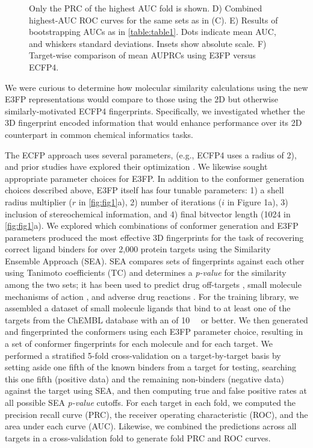 \documentclass[../main.tex]{subfiles}
\begin{document}
\begin{refsection}
\begin{figure}
{        Only the PRC of the highest AUC fold is shown.
        D) Combined highest-AUC ROC curves for the same sets as in  (C).
        E) Results of bootstrapping AUCs as in \cref{table:table1}.
        Dots indicate mean AUC, and whiskers standard deviations.
        Insets show absolute scale.
        F) Target-wise comparison of mean AUPRCs using E3FP versus ECFP4.}
    \label{fig:fig2}
\end{figure}

We were curious to determine how molecular similarity calculations using the new E3FP representations would compare to those using the 2D but otherwise similarly-motivated ECFP4 fingerprints.
Specifically, we investigated whether the 3D fingerprint encoded information that would enhance performance over its 2D counterpart in common chemical informatics tasks.

The ECFP approach uses several parameters, (e.g., ECFP4 uses a radius of 2), and prior studies have explored their optimization  \cite{hert_2004}.
We likewise sought appropriate parameter choices for E3FP.
In addition to the conformer generation choices described above, E3FP itself has four tunable parameters: 1) a shell radius multiplier ($r$ in \cref{fig:fig1}a), 2) number of iterations ($i$ in Figure 1a), 3) inclusion of stereochemical information, and 4) final bitvector length (1024 in \cref{fig:fig1}a).
We explored which combinations of conformer generation and E3FP parameters produced the most effective 3D fingerprints for the task of recovering correct ligand binders for over 2,000 protein targets using the Similarity Ensemble Approach (SEA).
SEA compares sets of fingerprints against each other using Tanimoto coefficients (TC) and determines a \emph{p-value} for the similarity among the two sets; it has been used to predict drug off-targets \cite{keiser_2007,keiser_2009,degraw_2010,yee_2015}, small molecule mechanisms of action \cite{laggner_2011,lemieux_2013,bruni_2016}, and adverse drug reactions  \cite{keiser_2007,lounkine_2012,lorberbaum_2015}.
For the training library, we assembled a dataset of small molecule ligands that bind to at least one of the targets from the ChEMBL database with an \ICfifty{} of  \SI{10}{\micro\molar} or better.
We then generated and fingerprinted the conformers using each E3FP parameter choice, resulting in a set of conformer fingerprints for each molecule and for each target.
We performed a stratified 5-fold cross-validation on a target-by-target basis by setting aside one fifth of the known binders from a target for testing, searching this one fifth (positive data) and the remaining non-binders (negative data) against the target using SEA, and then computing true and false positive rates at all possible SEA \emph{p-value} cutoffs.
For each target in each fold, we computed the precision recall curve (PRC), the receiver operating characteristic (ROC), and the area under each curve (AUC).
Likewise, we combined the predictions across all targets in a cross-validation fold to generate fold PRC and ROC curves.


\end{refsection}
\end{document}
